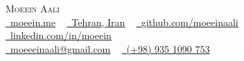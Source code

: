 \begin{center}
	{\Huge \scshape Moeein Aali}
	\\ \vspace{1pt}
	\href{https://moeein.me/}{\raisebox{-0.2\height}\faGlobe\ \underline{moeein.me}} ~
	\href{https://www.google.com/maps/place/Tehran,+Iran}{\raisebox{-0.2\height}\faMapMarker\ \underline{Tehran, Iran}} ~
	\href{https://github.com/moeeinaali}{\raisebox{-0.2\height}\faGithub\ \underline{github.com/moeeinaali}} ~
	\href{https://linkedin.com/in/moeein/}{\raisebox{-0.2\height}\faLinkedin\ \underline{linkedin.com/in/moeein}} ~ \\
	\href{mailto:moeeeinaali@gmail.com}{\raisebox{-0.2\height}\faEnvelope \ \underline{moeeeinaali@gmail.com}} ~ 
	\href{tel:+989351090753}{\small \raisebox{-0.1\height}\faPhone\ \underline{(+98) 935 1090 753}}
	\vspace{-8pt}
\end{center}
